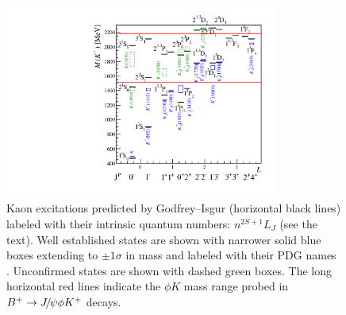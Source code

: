 \begin{figure}[tbhp]
  \begin{center}
    \includegraphics*[width=0.8\textwidth]{Figures/03_Zcs/06_Amplitude/kstars-nores} 
  \end{center}
  \vskip-0.3cm\caption{
   Kaon excitations predicted by Godfrey--Isgur \supercite{Godfrey:1985xj} (horizontal black lines)
   labeled with their intrinsic quantum numbers: $n{}^{2S+1}L_J$ (see the text).
   Well established states are shown 
   with narrower solid blue boxes extending
   to $\pm1\sigma$ in mass and labeled with their PDG names \supercite{PDG2014}.
   Unconfirmed states are shown with dashed green boxes.
   The long horizontal red lines indicate the $\phi K$ mass range probed in $B^+\rightarrow{\ensuremath{{J\mskip -3mu/\mskip -2mu\psi}}}\phi K^+$ decays. 
  \label{fig:kaons}
  }
\end{figure}

